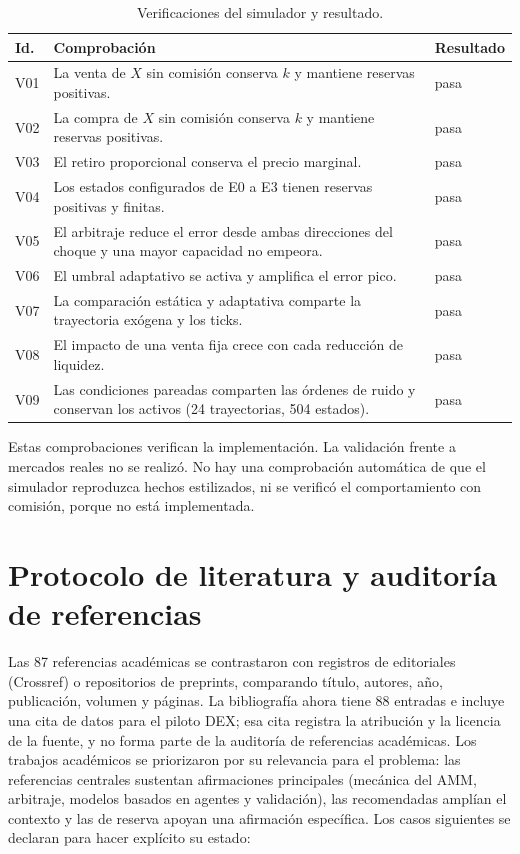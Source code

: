 \begin{table}[htbp]
\centering
\caption{Verificaciones del simulador y resultado.}
\label{tab:verificacion}
\small
\begin{tabularx}{\textwidth}{@{}l X l@{}}
\toprule
Id. & Comprobación & Resultado \\
\midrule
V01 & La venta de $X$ sin comisión conserva $k$ y mantiene reservas positivas. & pasa \\
V02 & La compra de $X$ sin comisión conserva $k$ y mantiene reservas positivas. & pasa \\
V03 & El retiro proporcional conserva el precio marginal. & pasa \\
V04 & Los estados configurados de E0 a E3 tienen reservas positivas y finitas. & pasa \\
V05 & El arbitraje reduce el error desde ambas direcciones del choque y una mayor capacidad no empeora. & pasa \\
V06 & El umbral adaptativo se activa y amplifica el error pico. & pasa \\
V07 & La comparación estática y adaptativa comparte la trayectoria exógena y los ticks. & pasa \\
V08 & El impacto de una venta fija crece con cada reducción de liquidez. & pasa \\
V09 & Las condiciones pareadas comparten las órdenes de ruido y conservan los activos (24 trayectorias, 504 estados). & pasa \\
\bottomrule
\end{tabularx}
\end{table}

Estas comprobaciones verifican la implementación. La validación frente a mercados reales no se realizó. No hay una comprobación automática de que el simulador reproduzca hechos estilizados, ni se verificó el comportamiento con comisión, porque no está implementada.

\section{Protocolo de literatura y auditoría de referencias}
\label{sec:protocolo-literatura}

Las 87 referencias académicas se contrastaron con registros de editoriales (Crossref) o repositorios de preprints, comparando título, autores, año, publicación, volumen y páginas. La bibliografía ahora tiene 88 entradas e incluye una cita de datos para el piloto DEX; esa cita registra la atribución y la licencia de la fuente, y no forma parte de la auditoría de referencias académicas. Los trabajos académicos se priorizaron por su relevancia para el problema: las referencias centrales sustentan afirmaciones principales (mecánica del AMM, arbitraje, modelos basados en agentes y validación), las recomendadas amplían el contexto y las de reserva apoyan una afirmación específica. Los casos siguientes se declaran para hacer explícito su estado:


